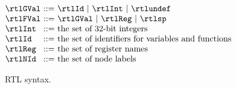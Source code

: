 \begin{figure}
\[
\begin{array}{@{}l@{~}c@{~}l@{~~}lr@{}}
\rtlGVal&::=&\multicolumn{2}{@{}l@{}}{\rtlId ~|~ \rtlInt ~|~ \rtlundef}\\
\rtlFVal&::=&\multicolumn{2}{@{}l@{}}{\rtlGVal ~|~ \rtlReg ~|~ \rtlsp}\\
\rtlInt&::=&\multicolumn{2}{@{}l@{}}{\text{the set of 32-bit integers}}\\
\rtlId&::=&\multicolumn{2}{@{}l@{}}{\text{the set of identifiers for variables and functions \qquad\qquad\qquad}}\\
\rtlReg&::=&\multicolumn{2}{@{}l@{}}{\text{the set of register names}}\\
\rtlNId&::=&\multicolumn{2}{@{}l@{}}{\text{the set of node labels}}\\
\end{array}
\]
\caption{RTL syntax.}
\label{fig:rtl-syntax}
\end{figure}


